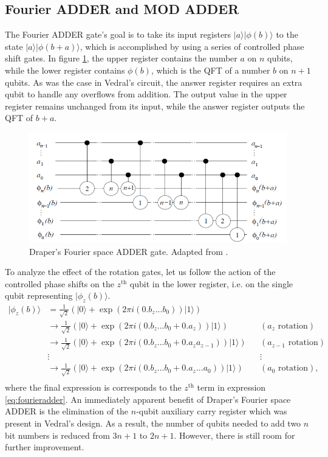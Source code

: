 \documentclass{article}
\begin{document}
\subsection{Fourier ADDER and MOD ADDER}
The Fourier ADDER gate's goal is to take its input registers $|a\rangle|\phi(b)\rangle$ to the state $|a\rangle|\phi(b+a)\rangle$, which is accomplished by using a series of controlled phase shift gates. In figure \ref{fig:phiADDER}, the upper register contains the number $a$ on $n$ qubits, while the lower register contains $\phi(b)$, which is the QFT of a number $b$ on $n+1$ qubits. As was the case in Vedral's circuit, the answer register requires an extra qubit to handle any overflows from addition. The output value in the upper register remains unchanged from its input, while the answer register outputs the QFT of $b+a$.
\begin{figure}[!htbp]
\centering
\includegraphics[width=1\textwidth]
{PHIadder.png}
\captionsetup{format = hang}
\caption{Draper's Fourier space ADDER gate. Adapted from \cite{Dra00}.}
\label{fig:phiADDER}
\end{figure}

To analyze the effect of the rotation gates, let us follow the action of the controlled phase shifts on the $z^\text{th}$ qubit in the lower register, i.e. on the single qubit representing $|\phi_z(b)\rangle$.
\begin{align*}
|\phi_z(b)\rangle &= \frac{1}{\sqrt{2}}\left(|0\rangle + \exp(2\pi i(0.b_z...b_0))|1\rangle\right) \\
&\to \frac{1}{\sqrt{2}}\left(|0\rangle + \exp(2\pi i(0.b_z...b_0 + 0.a_z))|1\rangle\right) && (a_z \text{ rotation}) \\
&\to \frac{1}{\sqrt{2}}\left(|0\rangle + \exp(2\pi i(0.b_z...b_0 + 0.a_z a_{z-1}))|1\rangle\right) && (a_{z-1} \text{ rotation})\\
& \vdots && \vdots\\
&\to \frac{1}{\sqrt{2}}\left(|0\rangle + \exp(2\pi i(0.b_z...b_0 + 0.a_z...a_0))|1\rangle\right) && (a_0 \text{ rotation}),\\
\end{align*}
where the final expression is corresponds to the $z^\text{th}$ term in expression \eqref{eq:fourieradder}. An immediately apparent benefit of Draper's Fourier space ADDER is the elimination of the $n$-qubit auxiliary carry register which was present in Vedral's design. As a result, the number of qubits needed to add two $n$ bit numbers is reduced from $3n+1$ to $2n+1$. However, there is still room for further improvement. 
\end{document}
